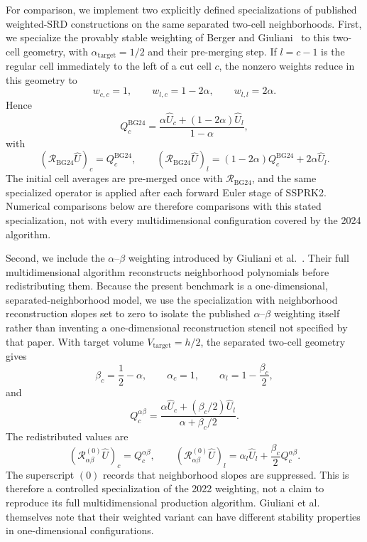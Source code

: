 \documentclass[preprint,12pt]{elsarticle}
\begin{document}
For comparison, we implement two explicitly defined specializations of
published weighted-SRD constructions on the same separated two-cell
neighborhoods.  First, we specialize the provably stable weighting of Berger
and Giuliani~\cite{BergerGiuliani2024} to this two-cell geometry, with
$\alpha_{\mathrm{target}}=1/2$ and their pre-merging step.  If $l=c-1$ is
the regular cell immediately to the left of a cut cell $c$, the nonzero
weights reduce in this geometry to
\[
    w_{c,c}=1,\qquad
    w_{l,c}=1-2\alpha,\qquad
    w_{l,l}=2\alpha.
\]
Hence
\[
    Q_c^{\mathrm{BG24}}
    =
    \frac{\alpha\widehat U_c+(1-2\alpha)\widehat U_l}{1-\alpha},
\]
with
\[
    (\mathcal R_{\mathrm{BG24}}\widehat U)_c=Q_c^{\mathrm{BG24}},
    \qquad
    (\mathcal R_{\mathrm{BG24}}\widehat U)_l
    =(1-2\alpha)Q_c^{\mathrm{BG24}}+2\alpha\widehat U_l.
\]
The initial cell averages are pre-merged once with
$\mathcal R_{\mathrm{BG24}}$, and the same specialized operator is applied
after each forward Euler stage of SSPRK2.  Numerical comparisons below are
therefore comparisons with this stated specialization, not with every
multidimensional configuration covered by the 2024 algorithm.

Second, we include the $\alpha$--$\beta$ weighting introduced by Giuliani
et al.~\cite{GiulianiEtAl2022}.  Their full multidimensional algorithm
reconstructs neighborhood polynomials before redistributing them.  Because
the present benchmark is a one-dimensional, separated-neighborhood model,
we use the specialization with neighborhood reconstruction slopes set to zero to isolate the published
$\alpha$--$\beta$ weighting itself rather than inventing a one-dimensional
reconstruction stencil not specified by that paper.  With target volume
$V_{\mathrm{target}}=h/2$, the separated two-cell geometry gives
\[
    \beta_c=\frac12-\alpha,\qquad
    \alpha_c=1,\qquad
    \alpha_l=1-\frac{\beta_c}{2},
\]
and
\[
    Q_c^{\alpha\beta}
    =
    \frac{\alpha\widehat U_c+(\beta_c/2)\widehat U_l}
         {\alpha+\beta_c/2}.
\]
The redistributed values are
\[
    (\mathcal R_{\alpha\beta}^{(0)}\widehat U)_c=Q_c^{\alpha\beta},
    \qquad
    (\mathcal R_{\alpha\beta}^{(0)}\widehat U)_l
    =\alpha_l\widehat U_l+\frac{\beta_c}{2}Q_c^{\alpha\beta}.
\]
The superscript $(0)$ records that neighborhood slopes are suppressed.  This
is therefore a controlled specialization of the 2022 weighting, not a claim
to reproduce its full multidimensional production algorithm.  Giuliani
et al.~\cite{GiulianiEtAl2022} themselves note that their weighted variant
can have different stability properties in one-dimensional configurations.
\end{document}
